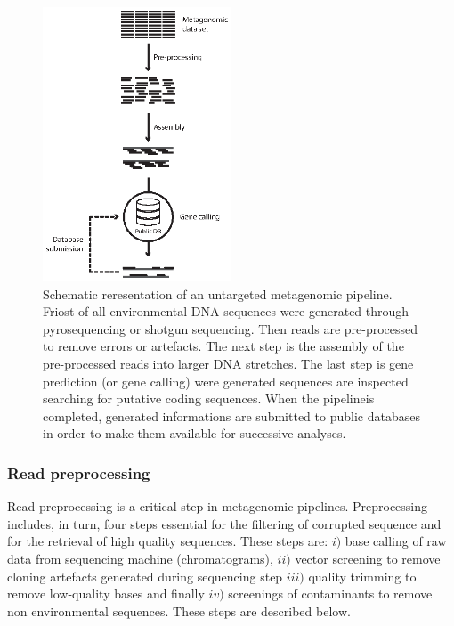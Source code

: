 \begin{figure}[!tb]
	\centering
	\includegraphics[width=0.5\textwidth]{./figures/Introduction/metagen_pipe}
  	\caption{Schematic reresentation of an untargeted metagenomic pipeline. Friost of all environmental DNA sequences were generated through pyrosequencing or shotgun sequencing. Then reads are pre-processed to remove errors or artefacts. The next step is the assembly of the pre-processed reads into larger DNA stretches. The last step is gene prediction (or gene calling) were generated sequences are inspected searching for putative coding sequences. When the pipelineis completed, generated informations are submitted to public databases in order to make them available for successive analyses. \label{fig:untrapipe}}
\end{figure}

\subsubsection{Read preprocessing}
Read preprocessing is a critical step in metagenomic pipelines. Preprocessing includes, in turn, four steps essential for the filtering of corrupted sequence and for the retrieval of high quality sequences. These steps are: $i)$ base calling of raw data from sequencing machine (chromatograms), $ii)$ vector screening to remove cloning artefacts generated during sequencing step $iii)$ quality trimming to remove low-quality bases and finally $iv)$ screenings of contaminants to remove non environmental sequences. These steps are described below.\\

